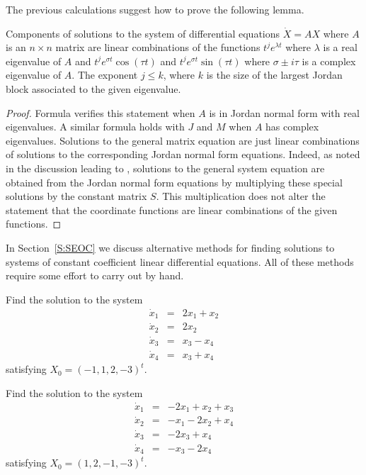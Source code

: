 \documentclass{ximera}
\begin{document}
The previous calculations suggest how to prove the following lemma.

\begin{lemma}  \label{R:pdeg}
Components of solutions to the system of differential equations $\dot{X}=AX$ 
where $A$ is an $n\times n$ matrix are linear combinations of the functions 
$t^je^{\lambda t}$ where $\lambda$ is a real eigenvalue of $A$ and 
$t^je^{\sigma t}\cos(\tau t)$ and $t^je^{\sigma t}\sin(\tau t)$ where
$\sigma\pm i\tau$ is a complex eigenvalue of $A$.   The exponent $j\leq k$, 
where $k$ is the size of the largest Jordan block associated to the given
eigenvalue. 
\end{lemma}

\begin{proof}  Formula  verifies this statement when $A$ is in Jordan 
normal form with real eigenvalues.  A similar formula holds with $J$ and $M$ 
when $A$ has complex eigenvalues.  Solutions to the general matrix equation 
are just linear combinations of solutions to the corresponding Jordan normal 
form equations.  Indeed, as noted in the discussion leading to , 
solutions to the general system equation are obtained from the Jordan normal 
form equations by multiplying these special solutions by the constant matrix
$S$.  This multiplication does not alter the statement that the coordinate
functions are linear combinations of the given functions.  \end{proof}

In Section~\ref{S:SEOC} we discuss alternative methods for finding solutions 
to systems of constant coefficient linear differential equations.  All of
these methods require some effort to carry out by hand.


\EXER

\TEXER

\begin{exercise} \label{c11.1.1}
Find the solution to the system
\begin{eqnarray*}
\dot{x}_1 & = & 2x_1+x_2 \\
\dot{x}_2 & = & 2x_2 \\
\dot{x}_3 & = & x_3-x_4 \\
\dot{x}_4 & = & x_3+x_4
\end{eqnarray*}
satisfying $X_0=(-1,1,2,-3)^t$.
\end{exercise}

\begin{exercise} \label{c11.1.2}
Find the solution to the system
\begin{eqnarray*}
\dot{x}_1 & = & -2x_1+x_2+x_3 \\
\dot{x}_2 & = & -x_1-2x_2+x_4 \\
\dot{x}_3 & = & -2x_3+x_4 \\
\dot{x}_4 & = & -x_3-2x_4
\end{eqnarray*}
satisfying $X_0=(1,2,-1,-3)^t$.
\end{exercise}
\end{document}
